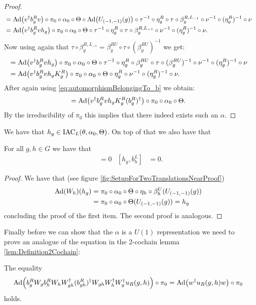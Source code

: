 \documentclass[11pt,a4paper,twoside]{article}
\numberwithin{equation}{section}
\begin{document}
\begin{proof}
	\begin{align}
		&=\Ad{v^\dagger b_g^R v}\circ\pi_0\circ\alpha_0\circ\Theta\circ\Ad{U_{(-1,-1)}(g)}\circ\tau^{-1}\circ\eta_g^R\circ\tau\circ\beta_g^{R,L_{-1}}\circ\nu^{-1}\circ(\eta_g^R)^{-1}\circ\nu\\
		&=\Ad{v^\dagger b_g^R vh_g}\circ\pi_0\circ\alpha_0\circ\Theta\circ\tau^{-1}\circ\eta_g^R\circ\tau\circ\beta_g^{R,L_{-1}}\circ\nu^{-1}\circ(\eta_g^R)^{-1}\circ\nu.
	\end{align}
	Now using again that $\tau\circ\beta_g^{R,L_{-1}}=\beta_{g}^{RU}\circ\tau\circ(\beta_g^{RU})^{-1}$ we get:
	\begin{align}
		&=\Ad{v^\dagger b_g^R vh_g}\circ\pi_0\circ\alpha_0\circ\Theta\circ\tau^{-1}\circ\eta_g^R\circ\beta_{g}^{RU}\circ\tau\circ(\beta_g^{RU})^{-1}\circ\nu^{-1}\circ(\eta_g^R)^{-1}\circ\nu\\
		&=\Ad{v^\dagger b_g^R vh_gK_g^R}\circ\pi_0\circ\alpha_0\circ\Theta\circ\eta_g^R\circ\nu^{-1}\circ(\eta_g^R)^{-1}\circ\nu.
	\end{align}
	After again using \eqref{eq:automorphismBelongingTo_b} we obtain:
	\begin{align}
		=\Ad{v^\dagger b_g^R vh_gK_g^R(b_g^R)^\dagger}\circ\pi_0\circ\alpha_0\circ\Theta.
	\end{align}
	By the irreducibility of $\pi_0$ this implies that there indeed exists such an $\alpha$.
\end{proof}
We have that $h_g\in\textrm{IAC}_L(\theta,\alpha_0,\Theta)$. On top of that we also have that
\begin{lemma}\label{lem:W_g_And_h_g_Commute}
	For all $g,h\in G$ we have that
	\begin{align}
		[h_g,W_h]&=0&[h_g,b_h^L]&=0.
	\end{align}
\end{lemma}
\begin{proof}
	We have that (see figure \ref{fig:SetupForTwoTranslationsNearProof})
	\begin{align}
		\Ad{W_h}(h_g)&=\pi_0\circ\alpha_0\circ\Theta\circ\eta_h\circ\beta_h^U(U_{(-1,-1)}(g))\\
		&=\pi_0\circ\alpha_0\circ\Theta(U_{(-1,-1)}(g))=h_g
	\end{align}
	concluding the proof of the first item. The second proof is analogous.
\end{proof}
Finally before we can show that the $\alpha$ is a $U(1)$ representation we need to prove an analogue of the equation in the 2-cochain lemma \ref{lem:Definition2Cochain}:
\begin{lemma}\label{lem:translating_u_R_To_The_Right_identity}
The equality
\begin{equation}
\Ad{b_g^R W_g b_h^R W_h W_{gh}^\dagger (b_{gh}^R)^\dagger W_{gh}W_h^\dagger W_g^\dagger u_R(g,h)}\circ\pi_0=\Ad{w^\dagger u_R(g,h) w}\circ\pi_0
\end{equation}
holds.
\end{lemma}
\end{document}
